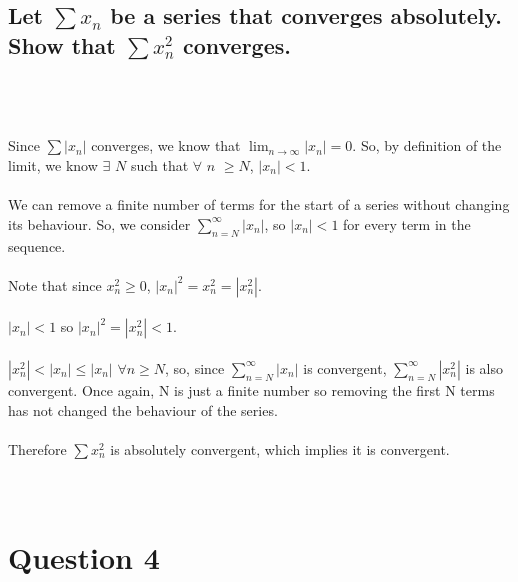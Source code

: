 \documentclass{article}
\begin{document}
\subsection*{Let $\sum x_n$ be a series that converges absolutely. Show that $\sum x^2_n$ converges.}
\solution
\\
\\
\\
Since \(\sum |x_n|\) converges, we know that $\lim_{n\to\infty} |x_n|$\(=0\). So, by definition of the limit, we know \(\exists\) \(N\) such that \(\forall\) \(n\) \(\geq N\), \(|x_n| < 1\).
\\
\\
We can remove a finite number of terms for the start of a series without changing its behaviour. So, we consider \(\sum_{n=N}^{\infty} |x_n|\), so \(|x_n| < 1\) for every term in the sequence.
\\
\\
Note that since \(x_n^2 \geq 0\), \(|x_n|^2 = x_n^2 = |x_n^2|\). 
\\
\\
\(|x_n| < 1\) so \(|x_n|^2 = |x_n^2| < 1\).
\\
\\
\(|x_n^2| < |x_n| \leq |x_n|\) \(\forall n \geq N\), so, since \(\sum_{n=N}^{\infty} |x_n|\) is convergent, \(\sum_{n=N}^{\infty} |x_n^2|\) is also convergent. Once again, N is just a finite number so removing the first N terms has not changed the behaviour of the series.
\\
\\
Therefore \(\sum x_n^2\) is absolutely convergent, which implies it is convergent.
\\
\\
\\
\section*{Question 4}
\end{document}
